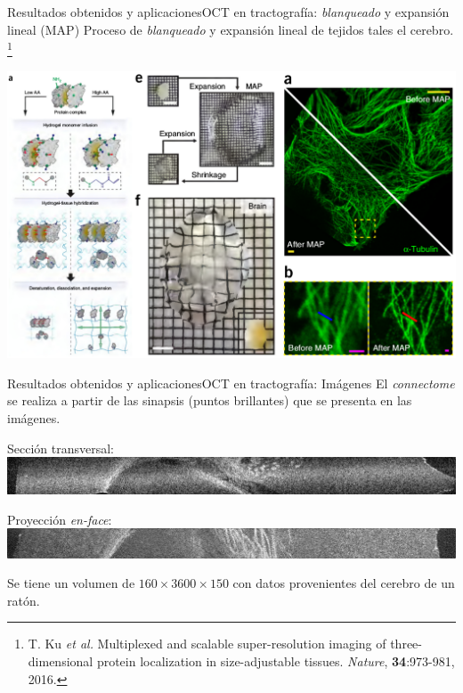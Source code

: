 \documentclass[fleqn,10pt]{beamer}
\newcommand\blfootnote[1]{%
	\begingroup
	\renewcommand\thefootnote{}\footnote{#1}%
	\addtocounter{footnote}{-1}%
	\endgroup
}
\begin{document}
\begin{frame}{Resultados obtenidos y aplicaciones}{OCT en tractografía: \emph{blanqueado} y expansión lineal (MAP)}
	Proceso de \emph{blanqueado} y expansión lineal de tejidos tales el cerebro. 
	\blfootnote{{\tiny T. Ku \emph{et al.} Multiplexed and scalable super-resolution imaging of three-dimensional protein localization in size-adjustable tissues. \emph{Nature}, \textbf{34}:973-981, 2016.}}
	\vfill
	
	\centering
	\includegraphics[width=0.9\linewidth]{AAUgraphics/pt3/Clarity_2}
\end{frame}

\begin{frame}{Resultados obtenidos y aplicaciones}{OCT en tractografía: Imágenes}
	El \emph{connectome} se realiza a partir de las sinapsis (puntos brillantes) que se presenta en las imágenes. 
	
	\vfill
	
	\centering
	Sección transversal:
	\includegraphics[width=1\linewidth]{AAUgraphics/pt3/Brain/ima_nsy_brain}
	
	\vfill
	
	Proyección \emph{en-face}:
	\includegraphics[width=1\linewidth]{AAUgraphics/pt3/Brain/Enface_nsy_brain}
	
	\vfill
	\raggedright
	Se tiene un volumen de  $160\times3600\times150$ con datos provenientes del cerebro de un ratón.
	
\end{frame}
\end{document}
